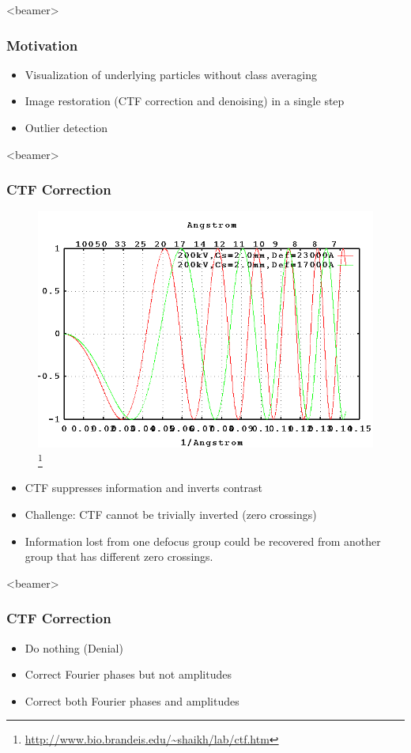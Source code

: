 \documentclass{beamer}
\begin{document}
\begin{frame}<beamer>
\frametitle{Motivation}
\begin{itemize}[<+->]
 \item Visualization of underlying particles \alert{without class averaging}
 \item Image restoration (CTF correction and denoising) in a \alert{single step}
  \item \alert{Outlier detection}
\end{itemize}
\end{frame}


\begin{frame}<beamer>
\frametitle{CTF Correction}
\begin{figure}[]
 \includegraphics[scale=0.4]{ctf2-ice.png}
 \footnote{\url{http://www.bio.brandeis.edu/~shaikh/lab/ctf.htm}}
\end{figure}


\begin{itemize}[<+->]
\item CTF suppresses information and inverts contrast
\item \alert{Challenge}: CTF cannot be trivially inverted (zero crossings)
\item Information lost from one defocus group could be recovered from another group that has different zero crossings.
\end{itemize}
\end{frame}


\begin{frame}<beamer>
\frametitle{CTF Correction}

\begin{itemize}
\item Do nothing (Denial) 
\item Correct Fourier phases but not amplitudes
\item Correct both Fourier phases and amplitudes 
\end{itemize}
\end{frame}
\end{document}
